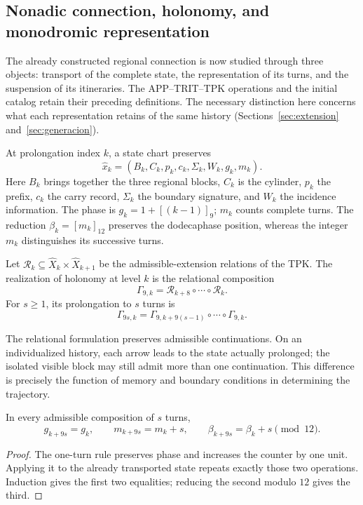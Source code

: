 \subsection{Nonadic connection, holonomy, and monodromic representation}
\label{mono-ampl:conexion}

The already constructed regional connection is now studied through three objects:
transport of the complete state, the representation of its turns, and the
suspension of its itineraries. The APP--TRIT--TPK operations and the
initial catalog retain their preceding definitions. The necessary
distinction here concerns what each representation retains of the
same history (Sections~\ref{sec:extension} and~\ref{sec:generacion}).

At prolongation index \(k\), a state chart preserves
\[
 \widehat x_k=(B_k,C_k,p_k,c_k,\Sigma_k,W_k,g_k,m_k).
\]
Here \(B_k\) brings together the three regional blocks, \(C_k\) is the cylinder,
\(p_k\) the prefix, \(c_k\) the carry record, \(\Sigma_k\) the boundary
signature, and \(W_k\) the incidence information. The phase is
\(g_k=1+[(k-1)]_9\); \(m_k\) counts complete turns. The reduction
\(\beta_k=[m_k]_{12}\) preserves the dodecaphase position, whereas the
integer \(m_k\) distinguishes its successive turns.

\begin{definition}
\label{mono-ampl:def-vuelta}
Let \(\mathcal R_k\subseteq\widehat X_k\times\widehat X_{k+1}\)
be the admissible-extension relations of the TPK. The realization of
holonomy at level \(k\) is the relational composition
\[
 \Gamma_{9,k}=\mathcal R_{k+8}\circ\cdots\circ\mathcal R_k.
\]
For \(s\geq1\), its prolongation to \(s\) turns is
\[
 \Gamma_{9s,k}=
 \Gamma_{9,k+9(s-1)}\circ\cdots\circ\Gamma_{9,k}.
\]
\end{definition}

The relational formulation preserves admissible continuations. On
an individualized history, each arrow leads to the state actually
prolonged; the isolated visible block may still admit more than one
continuation. This difference is precisely the function of memory and
boundary conditions in determining the trajectory.

\begin{proposition}
\label{mono-ampl:vueltas}
In every admissible composition of \(s\) turns,
\[
 g_{k+9s}=g_k,\qquad m_{k+9s}=m_k+s,\qquad
 \beta_{k+9s}=\beta_k+s\pmod{12}.
\]
\end{proposition}
\begin{proof}
The one-turn rule preserves phase and increases the counter by one
unit. Applying it to the already transported state repeats exactly those
two operations. Induction gives the first two equalities; reducing the
second modulo \(12\) gives the third.
\end{proof}

